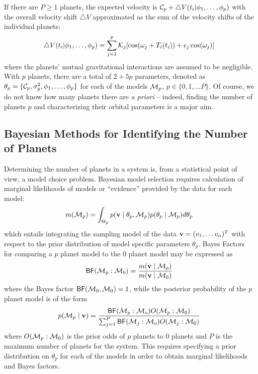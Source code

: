 If there are $P \ge 1$ planets, the expected velocity is ${\cal{C}}_p
+ \bigtriangleup V(t_i|\phi_1,\ldots,\phi_p)$ with the overall velocity shift
$\bigtriangleup V$  approximated as the sum of the velocity
shifts of the individual planets:
\begin{equation}\label{Velocity_2p_Model}
\bigtriangleup V(t_i|\phi_1,\ldots,\phi_p)=\sum_{j=1}^p
\K_j[\cos(\omega_j+T_i(t_i))+\e_j\cos(\omega_j)]
\end{equation}
where the planets' mutual gravitational interactions are assumed to be
negligible.  With $p$ planets, there are a total of $2+5p$ parameters,
denoted as 
$\theta_p = \{ \mathcal{C}_p,\sigma_p^2,\phi_1,\ldots,\phi_p\}$ for each of
the models ${\cal{M}}_p$, $p \in \{0, 1, \ldots P\}$. Of course, we do not
know how many planets there are \emph{a priori} -- indeed, finding the
number of planets $p$ and characterizing their orbital parameters is
a major aim.

\subsection{Bayesian Methods for Identifying the Number of Planets}
Determining the number of planets in a
system is, from a statistical point of view, a model choice
problem. Bayesian model selection requires calculation of marginal
likelihoods of models or ``evidence'' provided by the data for each model:
\begin{equation}\label{marginal_lik}
m( \M_p) = \int_{\Theta_p}
p(\v \mid \theta_p,\M_p) p(\theta_p \mid \M_p) d\theta_p
\end{equation} 
which entails integrating the sampling model of the
data $\mathbf{v} = (v_1, \ldots v_n)^T$ with respect to the prior distribution
of model specific parameters $\theta_p$.
Bayes Factors for comparing a $p$ planet model to the $0$ planet model
may be expressed  as
\begin{equation}
\BF(\M_p:\M_0)=\frac{m( \v \mid \M_p)}{m(\v \mid \M_0)}
\end{equation}
where the Bayes factor $\textsf{BF}({\cal{M}}_0,{\cal{M}}_0) = 1$,
while the posterior probability of the $p$ planet model is of the
form
\begin{equation}
  \label{eq:post-prob}
  p(\M_p \mid \v) = \frac{\BF(\M_p:\M_o) O(\M_p: \M_0)} 
{ \sum_{ j= 1}^{P} \BF(\M_j:\M_o) O(\M_j: \M_0)}
\end{equation}
where $O({\cal{M}}_p: {\cal{M}}_0)$ is the prior odds of $p$ planets to $0$
planets and $P$ is the maximum number of planets for the
system.  This requires specifying a prior distribution on $\theta_p$
for each of the models in order to obtain marginal likelihoods and
Bayes factors.


